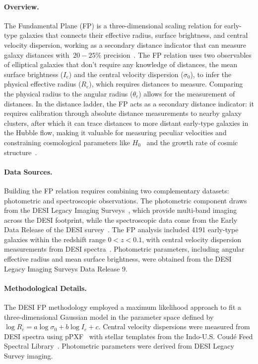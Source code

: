 \paragraph{Overview.}
The Fundamental Plane (FP) is a three-dimensional scaling relation for early-type galaxies that connects their effective radius, surface brightness, and central velocity dispersion, working as a secondary distance indicator that can measure galaxy distances with $~20-25\%$ precision~\citep{1987ApJ...313...59D,1987ApJ...313...42D}. The FP relation uses two observables of elliptical galaxies that don't require any knowledge of distances, the mean surface brightness ($I_e$) and the central velocity dispersion ($\sigma_0$), to infer the physical effective radius ($R_e$), which requires distances to measure. Comparing the physical radius to the angular radius ($\theta_e$) allows for the measurement of distances. In the distance ladder, the FP acts as a secondary distance indicator: it requires calibration through absolute distance measurements to nearby galaxy clusters, after which it can trace distances to more distant early-type galaxies in the Hubble flow, making it valuable for measuring peculiar velocities and constraining cosmological parameters like $H_0$~\citep{2025MNRAS.539.3627S,2025ApJ...979L...9S} and the growth rate of cosmic structure~\citep{2020MNRAS.494.3275A, 2020MNRAS.497.1275S, 2023MNRAS.518.2436T}.

\paragraph{Data Sources.}
Building the FP relation requires combining two complementary datasets: photometric and spectroscopic observations. The photometric component draws from the DESI Legacy Imaging Surveys~\citep{2019AJ....157..168D}, which provide multi-band imaging across the DESI footprint, while the spectroscopic data come from the Early Data Release of the DESI survey~\citep{2024AJ....168...58D}. The FP analysis included 4191 early-type galaxies within the redshift range  $0 < z < 0.1$, with central velocity dispersion measurements from DESI spectra~\citep{2025MNRAS.539.3627S}. Photometric parameters, including angular effective radius and mean surface brightness, were obtained from the DESI Legacy Imaging Surveys Data Release 9.

\paragraph{Methodological Details.}
The DESI FP methodology employed a maximum likelihood approach to fit a three-dimensional Gaussian model in the parameter space defined by $\log R_e = a \log \sigma_0 + b \log I_e + c$. Central velocity dispersions were measured from DESI spectra using pPXF~\citep{2023MNRAS.526.3273C} with stellar templates from the Indo-U.S. Coudé Feed Spectral Library~\citep{2004ApJS..152..251V}. Photometric parameters were derived from DESI Legacy Survey imaging. 

